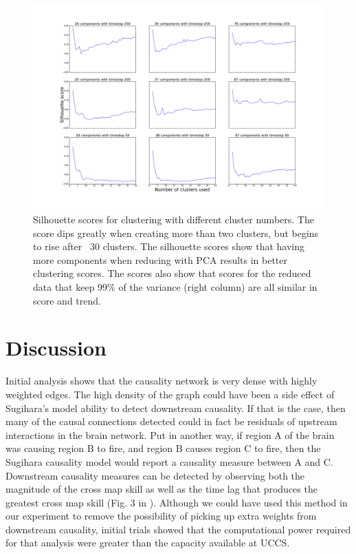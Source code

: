 \documentclass[journal,12pt,onecolumn,draftclsnofoot]{IEEEtran}  %
\begin{document}
\begin{figure}[H]
  \centering
  \includegraphics[width=\linewidth]{figures/silhouette_scores.pdf}
  \caption{Silhouette scores for clustering with different cluster numbers. The score dips greatly when creating more than two clusters, but begins to rise after ~30 clusters. The silhouette scores show that having more components when reducing with PCA results in better clustering scores. The scores also show that scores for the reduced data that keep 99\% of the variance (right column) are all similar in score and trend.}
  \label{fig:silhouette_scores}
\end{figure}


\section{Discussion}

Initial analysis shows that the causality network is very dense with highly weighted edges. The high density of the graph could have been a side effect of Sugihara's model ability to detect downstream causality. If that is the case, then many of the causal connections detected could in fact be residuals of upstream interactions in the brain network. Put in another way, if region A of the brain was causing region B to fire, and region B causes region C to fire, then the Sugihara causality model would report a causality measure between A and C. Downstream causality measures can be detected by observing both the magnitude of the cross map skill as well as the time lag that produces the greatest cross map skill (Fig. 3 in \cite{Ye2015}). Although we could have used this method in our experiment to remove the possibility of picking up extra weights from downstream causality, initial trials showed that the computational power required for that analysis were greater than the capacity available at UCCS. 
\end{document}
